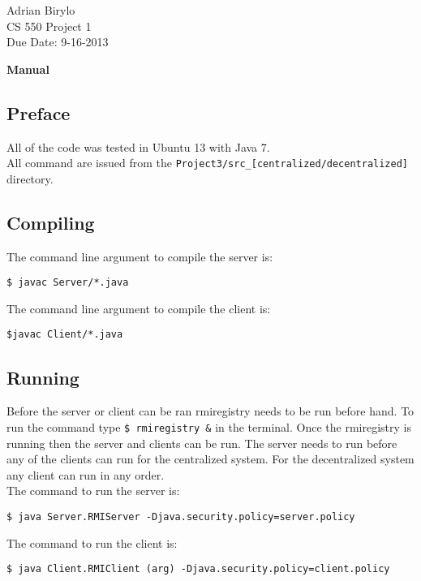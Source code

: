 \documentclass{article}
\begin{document}
\begin{flushright}
Adrian Birylo\\
CS 550 Project 1\\
Due Date: 9-16-2013\\
\end{flushright}

\begin{center}
\textbf{\huge{Manual}}
\end{center}



\subsection*{Preface}
All of the code was tested in Ubuntu 13 with Java 7. \\
All command are issued from the \texttt{Project3/src\_[centralized/decentralized]} directory. 

\subsection*{Compiling}
The command line argument to compile the server is: 

\begin{verbatim}
$ javac Server/*.java
\end{verbatim}

The command line argument to compile the client is:

\begin{verbatim}
$javac Client/*.java
\end{verbatim}

\subsection*{Running}

Before the server or client can be ran rmiregistry needs to be run before hand. To run the command type \texttt{\$ rmiregistry \&} in the terminal. Once the rmiregistry is running then the server and clients can be run. The server needs to run before any of the clients can run for the centralized system. For the decentralized system any client can run in any order.\\

\noindent
The command to run the server is:
\begin{verbatim}
$ java Server.RMIServer -Djava.security.policy=server.policy
\end{verbatim}
\noindent
The command to run the client is:
\begin{verbatim}
$ java Client.RMIClient (arg) -Djava.security.policy=client.policy
\end{verbatim}
\end{document}
